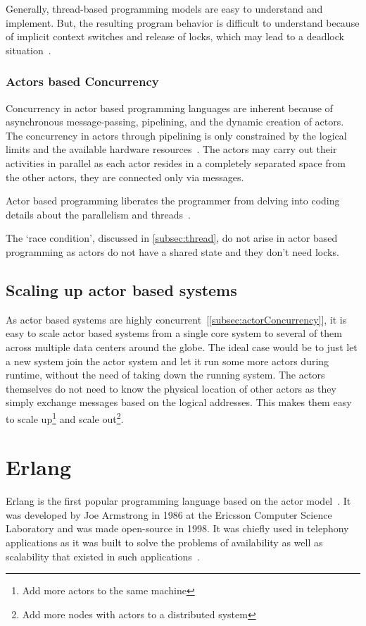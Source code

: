   Generally, thread-based programming models are easy to understand and implement. But, the resulting program behavior is difficult to understand because of implicit context switches and release of locks, which may lead to a deadlock situation~\cite{ambientTalk}.

\subsubsection{Actors based Concurrency}
\label{subsec:actorConcurrency}
  Concurrency in actor based programming languages are inherent because of asynchronous message-passing, pipelining, and the dynamic creation of actors. The concurrency in actors through pipelining is only constrained by the logical limits and the available hardware resources~\cite{agha}. The actors may carry out their activities in parallel as each actor resides in a completely separated space from the other actors, they are connected only via messages.

  Actor based programming liberates the programmer from delving into coding details about the parallelism and threads~\cite{agha}.

The ‘race condition’, discussed in \autoref{subsec:thread}, do not arise in actor based programming as actors do not have a shared state and they don't need locks.

\subsection{Scaling up actor based systems}
  As actor based systems are highly concurrent~[\autoref{subsec:actorConcurrency}], it is easy to scale actor based systems from a single core system to several of them across multiple data centers around the globe. The ideal case would be to just let a new system join the actor system and let it run some more actors during runtime, without the need of taking down the running system. The actors themselves do not need to know the physical location of other actors as they simply exchange messages based on the logical addresses. This makes them easy to scale up\footnote{Add more actors to the same machine} and scale out\footnote{Add more nodes with actors to a distributed system}.

\section{Erlang}
\label{sec:erlang}
  Erlang is the first popular programming language based on the actor model~\cite{vinoski}. It was developed by Joe Armstrong in 1986 at the Ericsson Computer Science Laboratory and was made open-source in 1998. It was chiefly used in telephony applications as it was built to solve the problems of availability as well as scalability that existed in such applications~\cite{armstrong}.

